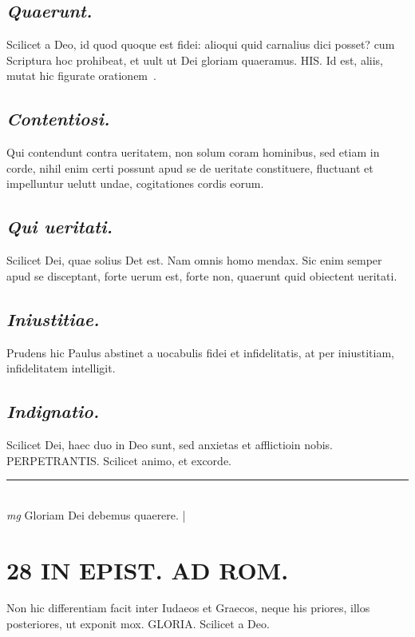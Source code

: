 \documentclass{article}
\begin{document}
\begin{pages}
\subsection*{\textit{Quaerunt. }}\pstart Scilicet a Deo, id quod quoque est fidei: alioqui quid carnalius dici posset? cum Scriptura hoc prohibeat, et uult ut Dei gloriam quaeramus. HIS. Id est, aliis, mutat hic figurate orationem .   \pend
{}
{}
\subsection*{\textit{Contentiosi. }}\pstart Qui contendunt contra ueritatem, non solum coram hominibus, sed etiam in corde, nihil enim certi possunt apud se de ueritate constituere, fluctuant et impelluntur uelutt undae, cogitationes cordis eorum.   \pend
{}
{}
\subsection*{\textit{Qui ueritati. }}\pstart Scilicet Dei, quae solius Det est. Nam omnis homo mendax. Sic enim semper apud se disceptant, forte uerum est, forte non, quaerunt quid obiectent ueritati.   \pend
{}
{}
\subsection*{\textit{Iniustitiae. }}\pstart Prudens hic Paulus abstinet a uocabulis fidei et infidelitatis, at per iniustitiam, infidelitatem intelligit.   \pend
{}
{}
\subsection*{\textit{Indignatio. }}\pstart Scilicet Dei, haec duo in Deo sunt, sed anxietas et afflictioin nobis. PERPETRANTIS.  Scilicet animo, et excorde.   \pend
\vspace{0.5cm}\noindent
\vspace{0.2cm}\rule{1cm}{0.2pt}\\ 
\hspace{0.2cm}\textit{mg}
\footnotesize Gloriam Dei debemus quaerere.  
\normalsize| 
\section*{28 IN EPIST. AD ROM.  }
\marginpar{[ p.]}\pstart Non hic differentiam facit inter Iudaeos et Graecos, neque his priores, illos posteriores, ut exponit mox. GLORIA. Scilicet a Deo.   \pend
{}
{}

\end{pages}
\end{document}
